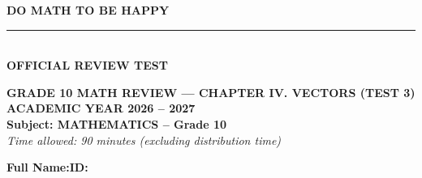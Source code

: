 \documentclass[10pt,a4paper]{article}
\begin{document}
\noindent
\begin{minipage}[c]{0.38\textwidth}
    \centering
    \textbf{DO MATH TO BE HAPPY}\\[-2pt]
    \rule{3.2cm}{0.6pt}\\[2pt]
    \textbf{OFFICIAL REVIEW TEST}
\end{minipage}\hfill
\begin{minipage}[c]{0.52\textwidth}
    \centering
    \textbf{GRADE 10 MATH REVIEW — CHAPTER IV. VECTORS (TEST 3)}\\[1pt]
    \textbf{ACADEMIC YEAR 2026 -- 2027}\\[1pt]
    \textbf{Subject: MATHEMATICS -- Grade 10}\\
    \textit{\small Time allowed: 90 minutes (excluding distribution time)}
\end{minipage}

\vspace{0.05cm}
\noindent
\begin{minipage}[b]{0.78\textwidth}
    \textbf{Full Name:}\dotfill\textbf{ID:}\makebox[3.5cm]{\dotfill}
\end{minipage}\hfill
\begin{minipage}[b]{0.20\textwidth}
    \hfill
    \setlength{\fboxrule}{0.8pt}%
\end{minipage}
\vspace{0.05cm}
\end{document}
